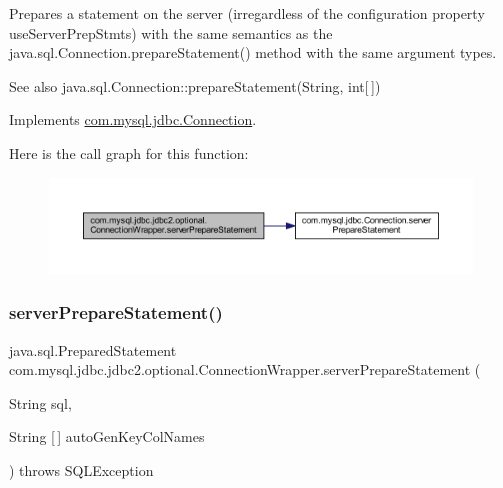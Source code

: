 Prepares a statement on the server (irregardless of the configuration property \textquotesingle{}use\+Server\+Prep\+Stmts\textquotesingle{}) with the same semantics as the java.\+sql.\+Connection.\+prepare\+Statement() method with the same argument types.

\begin{DoxySeeAlso}{See also}
java.\+sql.\+Connection\+::prepare\+Statement(\+String, int\mbox{[}$\,$\mbox{]}) 
\end{DoxySeeAlso}


Implements \mbox{\hyperlink{interfacecom_1_1mysql_1_1jdbc_1_1_connection_ad56f84a142159320cb267e94febd72d9}{com.\+mysql.\+jdbc.\+Connection}}.

Here is the call graph for this function\+:
\nopagebreak
\begin{figure}[H]
\begin{center}
\leavevmode
\includegraphics[width=350pt]{classcom_1_1mysql_1_1jdbc_1_1jdbc2_1_1optional_1_1_connection_wrapper_a4625dbf11fc977f96a2da25c00c2a396_cgraph}
\end{center}
\end{figure}
\mbox{\label{classcom_1_1mysql_1_1jdbc_1_1jdbc2_1_1optional_1_1_connection_wrapper_ab46a28f09e096cc8901db389bc4e6016}} 
\subsubsection{\texorpdfstring{server\+Prepare\+Statement()}{serverPrepareStatement()}\hspace{0.1cm}{\footnotesize\ttfamily [6/6]}}
{\footnotesize\ttfamily java.\+sql.\+Prepared\+Statement com.\+mysql.\+jdbc.\+jdbc2.\+optional.\+Connection\+Wrapper.\+server\+Prepare\+Statement (\begin{DoxyParamCaption}\item[{String}]{sql,  }\item[{String \mbox{[}$\,$\mbox{]}}]{auto\+Gen\+Key\+Col\+Names }\end{DoxyParamCaption}) throws S\+Q\+L\+Exception}


